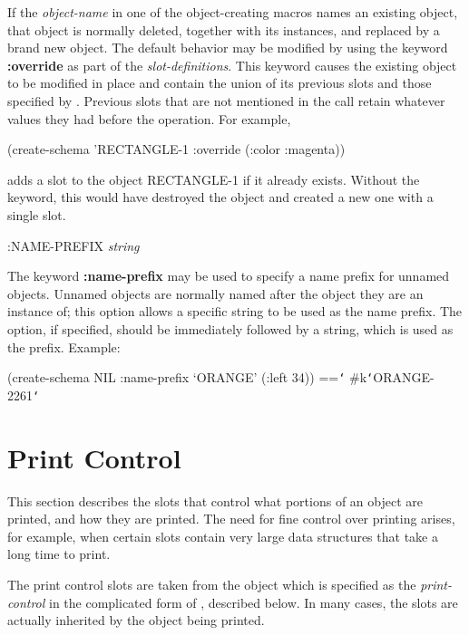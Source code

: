 If the {\it object-name} in one of the object-creating macros names an
existing object, that object is normally deleted, together with its
instances, and replaced by a brand new object.  The default
behavior may be modified by using the keyword {\bf :override} as part of the
{\it slot-definitions}.  This keyword causes the existing object to be
modified in place and contain the union of its previous slots and those
specified by .  Previous slots that are not mentioned in the
call retain whatever values they had before the operation.  For example,

\begin{programexample}
(create-schema 'RECTANGLE-1 :override (:color :magenta))
\end{programexample}
adds a slot to the object RECTANGLE-1 if it already exists.  Without
the  keyword, this would have destroyed the object and created
a new one with a single slot.



\value{f-top}
\begin{example}
:NAME-PREFIX {\it string}\value{keyword}\end{example}

The keyword {\bf :name-prefix} may be used to
specify a name prefix for unnamed objects.  Unnamed objects are normally
named after the object they are an instance of; this option allows a
specific string to be used as the name prefix.  The option, if specified,
should be immediately followed by a string, which is used as the prefix.
Example:
\begin{programexample}
(create-schema NIL :name-prefix `ORANGE'
  (:left 34)) =={\tt\char`\>} \#k{\tt\char`\<}ORANGE-2261{\tt\char`\>}
\end{programexample}




\section{Print Control}
\value{s-top}

This section describes the slots that control what portions of an object are
printed, and how they are printed.  The need for fine control over printing
arises, for example, when certain slots contain very large data structures
that take a long time to print.

The print control slots are taken from the object which is specified as the
{\it print-control} in the complicated form of , described below.  In
many cases, the slots are actually inherited by the object being printed.


